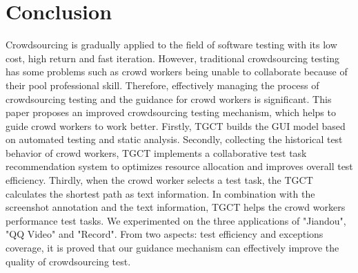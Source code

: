 \section{Conclusion}
Crowdsourcing is gradually applied to the field of software testing with its low cost, high return and fast iteration. However, traditional crowdsourcing testing has some problems such as crowd workers being unable to collaborate because of their pool professional skill. Therefore, effectively managing the process of crowdsourcing testing and the guidance for crowd workers is significant.
This paper proposes an improved crowdsourcing testing mechanism, which helps to guide crowd workers to work better. Firstly, TGCT builds the GUI model based on automated testing and static analysis. Secondly, collecting the historical test behavior of crowd workers, TGCT implements a collaborative test task recommendation system to optimizes resource allocation and improves overall test efficiency. Thirdly, when the crowd worker selects a test task, the TGCT calculates the shortest path as text information. In combination with the screenshot annotation and the text information, TGCT helps the crowd workers performance test tasks. We experimented on the three applications of "Jiandou", "QQ Video" and "Record". From two aspects: test efficiency and exceptions coverage, it is proved that our guidance mechanism can effectively improve the quality of crowdsourcing test.